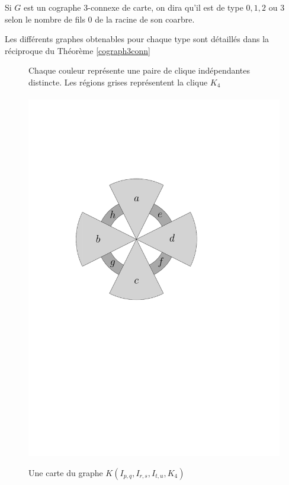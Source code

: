 \documentclass{scrartcl}
\begin{document}
\begin{flushleft}
\begin{def*}[Type]
    Si $G$ est un cographe $3$-connexe de carte, on dira qu'il est de type $0,1,2$ ou $3$ selon le nombre de fils $0$ de la racine de son
    coarbre.
\end{def*}

Les différents graphes obtenables pour chaque type sont détaillés dans la réciproque du Théorème \ref{cograph3conn}

\begin{figure}[h]
    \caption{Une carte du graphe $K(I_{p,q}, I_{r,s}, I_{t,u}, K_4)$}\label{IpqIrsItuMap}
    \begin{center}
        Chaque couleur représente une paire de clique indépendantes distincte. Les régions grises représentent la clique $K_4$
        \\~\\
        \includegraphics[page=\ipeFigIpqIrsItuMap, scale = 0.6]{figs}
    \end{center}
\end{figure}


\end{flushleft}
\end{document}
